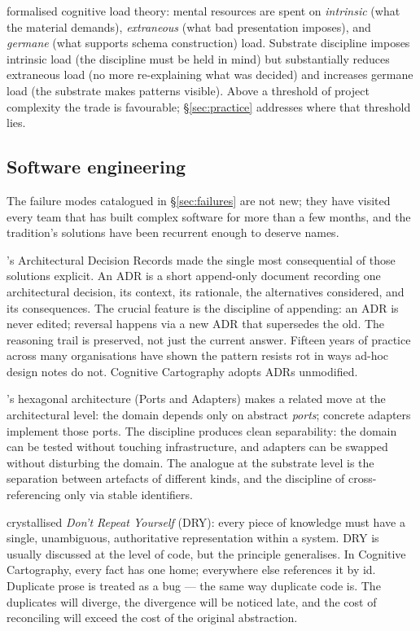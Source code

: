 \documentclass[11pt,a4paper,twocolumn]{article}
\begin{document}
\citet{sweller1988cognitive} formalised cognitive load theory:
mental resources are spent on \emph{intrinsic} (what the material
demands), \emph{extraneous} (what bad presentation imposes), and
\emph{germane} (what supports schema construction) load. Substrate
discipline imposes intrinsic load (the discipline must be held in
mind) but substantially reduces extraneous load (no more
re-explaining what was decided) and increases germane load (the
substrate makes patterns visible). Above a threshold of project
complexity the trade is favourable; \S\ref{sec:practice} addresses
where that threshold lies.

\subsection{Software engineering}

The failure modes catalogued in \S\ref{sec:failures} are not new;
they have visited every team that has built complex software for
more than a few months, and the tradition's solutions have been
recurrent enough to deserve names.

\citet{nygard2011adr}'s Architectural Decision Records made the
single most consequential of those solutions explicit. An ADR is a
short append-only document recording one architectural decision, its
context, its rationale, the alternatives considered, and its
consequences. The crucial feature is the discipline of appending: an
ADR is never edited; reversal happens via a new ADR that supersedes
the old. The reasoning trail is preserved, not just the current
answer. Fifteen years of practice across many organisations have
shown the pattern resists rot in ways ad-hoc design notes do not.
Cognitive Cartography adopts ADRs unmodified.

\citet{cockburn2005hexagonal}'s hexagonal architecture (Ports and
Adapters) makes a related move at the architectural level: the
domain depends only on abstract \emph{ports}; concrete adapters
implement those ports. The discipline produces clean separability:
the domain can be tested without touching infrastructure, and
adapters can be swapped without disturbing the domain. The analogue
at the substrate level is the separation between artefacts of
different kinds, and the discipline of cross-referencing only via
stable identifiers.

\citet{hunt1999pragmatic} crystallised \emph{Don't Repeat Yourself}
(DRY): every piece of knowledge must have a single, unambiguous,
authoritative representation within a system. DRY is usually
discussed at the level of code, but the principle generalises. In
Cognitive Cartography, every fact has one home; everywhere else
references it by id. Duplicate prose is treated as a bug --- the
same way duplicate code is. The duplicates will diverge, the
divergence will be noticed late, and the cost of reconciling will
exceed the cost of the original abstraction.
\end{document}
